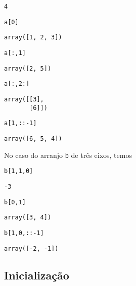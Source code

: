 \begin{verbatim}
4
\end{verbatim}

\begin{lstlisting}
a[0]
\end{lstlisting}

\begin{verbatim}
array([1, 2, 3])
\end{verbatim}

\begin{lstlisting}
a[:,1]
\end{lstlisting}

\begin{verbatim}
array([2, 5])
\end{verbatim}

\begin{lstlisting}
a[:,2:]
\end{lstlisting}

\begin{verbatim}
array([[3],
       [6]])
\end{verbatim}

\begin{lstlisting}
a[1,::-1]
\end{lstlisting}

\begin{verbatim}
array([6, 5, 4])
\end{verbatim}

No caso do arranjo \lstinline+b+ de três eixos, temos

\begin{lstlisting}
b[1,1,0]
\end{lstlisting}

\begin{verbatim}
-3
\end{verbatim}

\begin{lstlisting}
b[0,1]
\end{lstlisting}

\begin{verbatim}
array([3, 4])
\end{verbatim}

\begin{lstlisting}
b[1,0,::-1]
\end{lstlisting}

\begin{verbatim}
array([-2, -1])
\end{verbatim}


\subsection{Inicialização}

